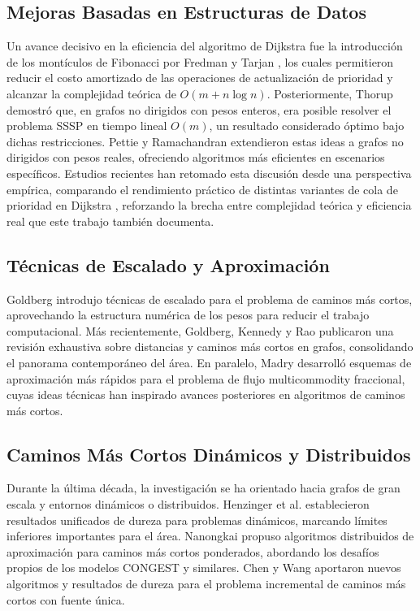 \documentclass[conference]{IEEEtran}
\begin{document}
\subsection{Mejoras Basadas en Estructuras de Datos}

Un avance decisivo en la eficiencia del algoritmo de Dijkstra fue la introducción de los montículos de Fibonacci por Fredman y Tarjan \cite{fredman1987}, los cuales permitieron reducir el costo amortizado de las operaciones de actualización de prioridad y alcanzar la complejidad teórica de $O(m + n \log n)$. Posteriormente, Thorup \cite{thorup1999} demostró que, en grafos no dirigidos con pesos enteros, era posible resolver el problema SSSP en tiempo lineal $O(m)$, un resultado considerado óptimo bajo dichas restricciones. Pettie y Ramachandran \cite{pettie2002} extendieron estas ideas a grafos no dirigidos con pesos reales, ofreciendo algoritmos más eficientes en escenarios específicos. Estudios recientes han retomado esta discusión desde una perspectiva empírica, comparando el rendimiento práctico de distintas variantes de cola de prioridad en Dijkstra \cite{costa2025, lewis2023, idowu2025}, reforzando la brecha entre complejidad teórica y eficiencia real que este trabajo también documenta.

\subsection{Técnicas de Escalado y Aproximación}

Goldberg \cite{goldberg1995} introdujo técnicas de escalado para el problema de caminos más cortos, aprovechando la estructura numérica de los pesos para reducir el trabajo computacional. Más recientemente, Goldberg, Kennedy y Rao \cite{distances2019} publicaron una revisión exhaustiva sobre distancias y caminos más cortos en grafos, consolidando el panorama contemporáneo del área. En paralelo, Madry \cite{madry2010} desarrolló esquemas de aproximación más rápidos para el problema de flujo multicommodity fraccional, cuyas ideas técnicas han inspirado avances posteriores en algoritmos de caminos más cortos.

\subsection{Caminos Más Cortos Dinámicos y Distribuidos}

Durante la última década, la investigación se ha orientado hacia grafos de gran escala y entornos dinámicos o distribuidos. Henzinger et al. \cite{henzinger2016} establecieron resultados unificados de dureza para problemas dinámicos, marcando límites inferiores importantes para el área. Nanongkai \cite{nanongkai2014} propuso algoritmos distribuidos de aproximación para caminos más cortos ponderados, abordando los desafíos propios de los modelos CONGEST y similares. Chen y Wang \cite{anonimo2022} aportaron nuevos algoritmos y resultados de dureza para el problema incremental de caminos más cortos con fuente única.
\end{document}
